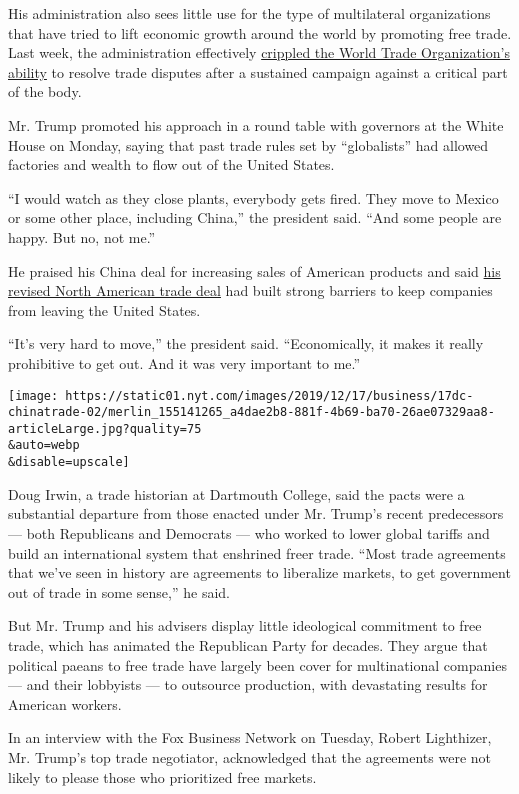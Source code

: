 His administration also sees little use for the type of multilateral
organizations that have tried to lift economic growth around the world
by promoting free trade. Last week, the administration effectively
\href{https://www.nytimes.com/2019/12/08/business/trump-trade-war-wto.html}{crippled
the World Trade Organization's ability} to resolve trade disputes after
a sustained campaign against a critical part of the body.

Mr. Trump promoted his approach in a round table with governors at the
White House on Monday, saying that past trade rules set by
``globalists'' had allowed factories and wealth to flow out of the
United States.

``I would watch as they close plants, everybody gets fired. They move to
Mexico or some other place, including China,'' the president said. ``And
some people are happy. But no, not me.''

He praised his China deal for increasing sales of American products and
said
\href{https://www.nytimes.com/2019/12/10/us/politics/usmca-trade-deal.html}{his
revised North American trade deal} had built strong barriers to keep
companies from leaving the United States.

``It's very hard to move,'' the president said. ``Economically, it makes
it really prohibitive to get out. And it was very important to me.''

\texttt{[image: https://static01.nyt.com/images/2019/12/17/business/17dc-chinatrade-02/merlin\_155141265\_a4dae2b8-881f-4b69-ba70-26ae07329aa8-articleLarge.jpg?quality=75\\\&auto=webp\\\&disable=upscale]}

Doug Irwin, a trade historian at Dartmouth College, said the pacts were
a substantial departure from those enacted under Mr. Trump's recent
predecessors --- both Republicans and Democrats --- who worked to lower
global tariffs and build an international system that enshrined freer
trade. ``Most trade agreements that we've seen in history are agreements
to liberalize markets, to get government out of trade in some sense,''
he said.

But Mr. Trump and his advisers display little ideological commitment to
free trade, which has animated the Republican Party for decades. They
argue that political paeans to free trade have largely been cover for
multinational companies --- and their lobbyists --- to outsource
production, with devastating results for American workers.

In an interview with the Fox Business Network on Tuesday, Robert
Lighthizer, Mr. Trump's top trade negotiator, acknowledged that the
agreements were not likely to please those who prioritized free markets.

